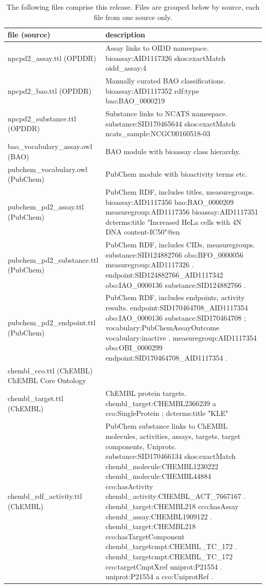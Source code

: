 \begin{table}[]
\caption{The following files comprise this release.  Files are grouped below by source, each file from one source only.}
\label{tab:opddr_05}
\centering
\begin{tabular}{p{0.3\linewidth}p{0.7\linewidth}}
\hline
\textbf{file (source)} & \textbf{description} \\
\hline
npcpd2\_assay.ttl (OPDDR) & Assay links to OIDD namespace. 
bioassay:AID1117326 skos:exactMatch oidd\_assay:4 \\
npcpd2\_bao.ttl (OPDDR) & Manually curated BAO classifications. 
bioassay:AID1117352 rdf:type bao:BAO\_0000219 \\
npcpd2\_substance.ttl (OPDDR) & Substance links to NCATS namespace. 
substance:SID170465644 skos:exactMatch ncats\_sample:NCGC00160518-03 \\
bao\_vocabulary\_assay.owl (BAO) & BAO module with bioassay class hierarchy.  \\
pubchem\_vocabulary.owl (PubChem) & PubChem module with bioactivity terms etc. \\
pubchem\_pd2\_assay.ttl (PubChem) & PubChem RDF, includes titles, measuregroups. 
bioassay:AID1117356 bao:BAO\_0000209 measuregroup:AID1117356 
bioassay:AID1117351 dcterms:title "Increased HeLa cells with 4N DNA content-IC50"@en  \\
pubchem\_pd2\_substance.ttl (PubChem) & PubChem RDF, includes CIDs, measuregroups. 
substance:SID124882766 obo:BFO\_0000056 measuregroup:AID1117326 . 
endpoint:SID124882766\_AID1117342 obo:IAO\_0000136 substance:SID124882766 . \\
pubchem\_pd2\_endpoint.ttl (PubChem) & PubChem RDF, includes endpoints, activity results.
endpoint:SID170464708\_AID1117354 
    obo:IAO\_0000136 substance:SID170464708 ; 
    vocabulary:PubChemAssayOutcome vocabulary:inactive . 
measuregroup:AID1117354 obo:OBI\_0000299 endpoint:SID170464708\_AID1117354 . \\
chembl\_cco.ttl (ChEMBL) ChEMBL Core Ontology \\
chembl\_target.ttl (ChEMBL) & ChEMBL protein targets. 
chembl\_target:CHEMBL2366239 a cco:SingleProtein ; dcterms:title "KLE" \\
chembl\_rdf\_activity.ttl (ChEMBL) & \makecell{PubChem substance links to ChEMBL molecules, activities, assays, targets, target components, Uniprots. \\ substance:SID170466134 skos:exactMatch chembl\_molecule:CHEMBL1230222 \\ chembl\_molecule:CHEMBL44884 cco:hasActivity chembl\_activity:CHEMBL\_ACT\_7667167 . \\ chembl\_target:CHEMBL218 cco:hasAssay chembl\_assay:CHEMBL1909122 . \\ chembl\_target:CHEMBL218 cco:hasTargetComponent chembl\_targetcmpt:CHEMBL\_TC\_172 . \\ chembl\_targetcmpt:CHEMBL\_TC\_172 cco:targetCmptXref uniprot:P21554 . \\ uniprot:P21554 a cco:UniprotRef . } \\
\hline
\end{tabular}
\end{table}


